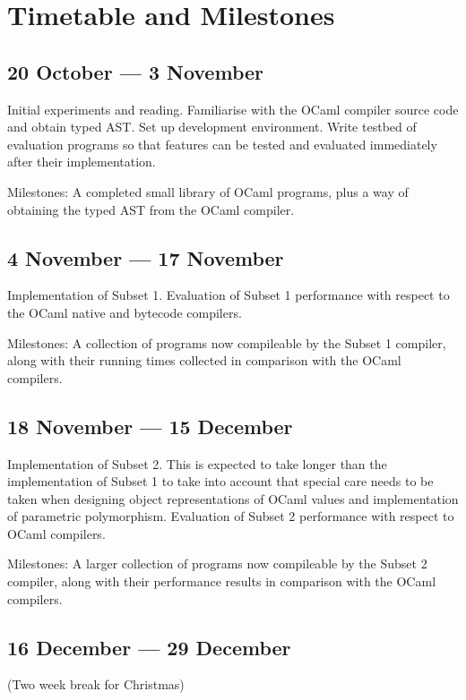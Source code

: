 \section*{Timetable and Milestones}

\subsection*{20 October --- 3 November}

Initial experiments and reading. Familiarise with the OCaml compiler source
code and obtain typed AST\@. Set up development environment. Write testbed of
evaluation programs so that features can be tested and evaluated immediately
after their implementation.

Milestones: A completed small library of OCaml programs, plus a way of
obtaining the typed AST from the OCaml compiler.

\subsection*{4 November --- 17 November}

Implementation of Subset 1. Evaluation of Subset 1 performance with respect to
the OCaml native and bytecode compilers.

Milestones: A collection of programs now compileable by the Subset 1 compiler,
along with their running times collected in comparison with the OCaml
compilers.

\subsection*{18 November --- 15 December}

Implementation of Subset 2. This is expected to take longer than the
implementation of Subset 1 to take into account that special care needs to be
taken when designing object representations of OCaml values and implementation
of parametric polymorphism. Evaluation of Subset 2 performance with respect to
OCaml compilers.

Milestones: A larger collection of programs now compileable by the Subset 2
compiler, along with their performance results in comparison with the OCaml
compilers.

\subsection*{16 December --- 29 December}

(Two week break for Christmas)


